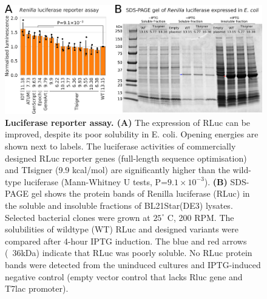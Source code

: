 \begin{figure}[htbp!]
	\center
	\includegraphics[width=1\textwidth]{appendix/TIsigner/Figs/S13.png}
	\caption[Luciferase reporter assay.]{\textbf{Luciferase reporter assay. (A)} The expression of RLuc can be improved, despite its poor solubility in E. coli. Opening energies are shown next to labels. The luciferase activities of commercially designed RLuc reporter genes (full-length sequence optimisation) and TIsigner (9.9 kcal/mol) are significantly higher than the wild-type luciferase (Mann-Whitney U tests, P=$9.1\times10^{−3}$). \textbf{(B)} SDS-PAGE gel shows the protein bands of Renilla luciferase (RLuc) in the soluble and insoluble fractions of BL21Star(DE3) lysates. Selected bacterial clones were grown at $25^{\circ}$ C, 200 RPM. The solubilities of wildtype (WT) RLuc and designed variants were compared after 4-hour IPTG induction. The blue and red arrows (~36kDa) indicate that RLuc was poorly soluble. No RLuc protein bands were detected from the uninduced cultures and IPTG-induced negative control (empty vector control that lacks Rluc gene and T7lac promoter).
	}
	\label{fig:appendix_TIsigner_S13}
\end{figure}


